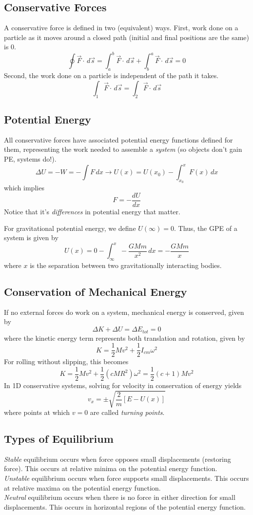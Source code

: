\documentclass[../PhysicsFormulae.tex]{subfiles}
\begin{document}
\subsection{Conservative Forces}
A conservative force is defined in two (equivalent) ways. First, work done on a particle as it moves around a closed path (initial and final positions are the same) is 0. 
\[ \oint \vec{F} \cdot \,d\vec{s} = \int_a^b \vec{F} \cdot \,d\vec{s} + \int_b^a \vec{F} \cdot \,d\vec{s} = 0 \]
Second, the work done on a particle is independent of the path it takes.
\[ \int_1 \vec{F} \cdot \,d\vec{s} = \int_2 \vec{F} \cdot \,d\vec{s} \]

\subsection{Potential Energy}
All conservative forces have associated potential energy functions defined for them, representing the work needed to assemble a \textit{system} (so objects don't gain PE, systems do!). 
\[ \Delta U = -W = - \int F \,dx \rightarrow U(x) = U(x_0) - \int_{x_0}^{x} F(x) \,dx \]
which implies
\[ F = - \frac{dU}{dx} \]
Notice that it's \textit{differences} in potential energy that matter. \bigskip

For gravitational potential energy, we define $ U(\infty) = 0 $. Thus, the GPE of a system is given by
\[ U(x) = 0 - \int_{\infty}^{x} -\frac{GMm}{x^2} \,dx = -\frac{GMm}{x} \]
where $x$ is the separation between two gravitationally interacting bodies. 

\subsection{Conservation of Mechanical Energy}
If no external forces do work on a system, mechanical energy is conserved, given by
\[ \Delta K + \Delta U = \Delta E_{tot} = 0 \]
where the kinetic energy term represents both translation and rotation, given by
\[ K = \frac{1}{2}Mv^2 + \frac{1}{2}I_{cm}\omega^2 \] 
For rolling without slipping, this becomes 
\[ K = \frac{1}{2}Mv^2 + \frac{1}{2}(cMR^2)\omega^2 = \frac{1}{2}(c+1)Mv^2 \]
In 1D conservative systems, solving for velocity in conservation of energy yields
\[ v_x = \pm \sqrt{\frac{2}{m} [E-U(x)]} \]
where points at which $v=0$ are called \textit{turning points}. 

\subsection{Types of Equilibrium}
\textit{Stable} equilibrium occurs when force opposes small displacements (restoring force). This occurs at relative minima on the potential energy function.\\
\textit{Unstable} equilibrium occurs when force supports small displacements. This occurs at relative maxima on the potential energy function. \\
\textit{Neutral} equilibrium occurs when there is no force in either direction for small displacements. This occurs in horizontal regions of the potential energy function.
\end{document}
